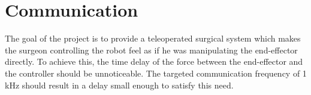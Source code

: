 \chapter{Communication}\label{cha:communication}

The goal of the project is to provide a teleoperated surgical system which makes the surgeon controlling the robot feel as if he was manipulating the end-effector directly. To achieve this, the time delay of the force between the end-effector and the controller should be unnoticeable. The targeted communication frequency of 1 kHz should result in a delay small enough to satisfy this need.






















